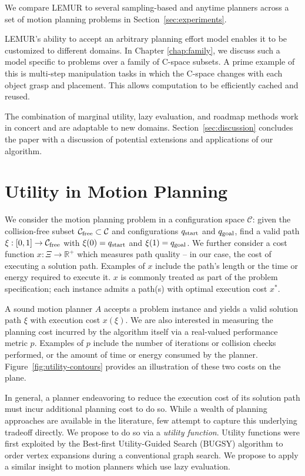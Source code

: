 We compare LEMUR to several sampling-based and anytime planners
across a set of motion planning problems
in Section~\ref{sec:experiments}.

LEMUR's ability to accept an arbitrary planning effort model
enables it to be customized to different domains.
In Chapter \ref{chap:family},
we discuss such a model specific to problems over a family of
C-space subsets.
A prime example of this is multi-step manipulation tasks
in which the C-space changes with each object grasp and placement.
This allows computation to be efficiently cached and reused.

The combination of
marginal utility, lazy evaluation, and roadmap methods
work in concert and are adaptable to new domains.
Section~\ref{sec:discussion} concludes the paper with a discussion
of potential extensions and applications of our algorithm.

\section{Utility in Motion Planning}
\label{sec:utility}

We consider the motion planning problem in a configuration space
$\mathcal{C}$:
given the collision-free subset
$\mathcal{C}_{\mbox{\scriptsize free}} \subset \mathcal{C}$
and configurations
$q_{\mbox{\scriptsize start}}$ and $q_{\mbox{\scriptsize goal}}$,
find a valid path
$\xi: [0,1] \rightarrow \mathcal{C}_{\mbox{\scriptsize free}}$
with $\xi(0) = q_{\mbox{\scriptsize start}}$
and $\xi(1) = q_{\mbox{\scriptsize goal}}$.
We further consider a cost function
$x: \Xi \rightarrow \mathbb{R}^+$
which measures path quality --
in our case, the cost of executing a solution path.
Examples of $x$ include the path's length
or the time or energy required to execute it.
$x$ is commonly treated as part of the problem specification;
each instance admits a path(s) with optimal execution cost $x^*$.

A sound motion planner $A$ accepts a problem instance
and yields a valid solution path $\xi$
with execution cost $x(\xi)$.
We are also interested in measuring the planning cost incurred by
the algorithm itself
via a real-valued performance metric $p$.
Examples of $p$ include the number of iterations or
collision checks performed,
or the amount of time or energy consumed by the planner.
Figure~\ref{fig:utility-contours} provides an illustration of
these two costs on the plane.

In general,
a planner endeavoring to reduce the execution cost of its solution path
must incur additional planning cost to do so.
While a wealth of planning approaches are available in the literature,
few attempt to capture this underlying tradeoff directly.
We propose to do so via a \emph{utility function}.
Utility functions were first exploited by the
Best-first Utility-Guided Search (BUGSY) algorithm
\citep{ruml2007bugsy,burns2013bugsy}
to order vertex expansions during a
conventional graph search.
We propose to apply a similar insight to motion planners
which use lazy evaluation.

